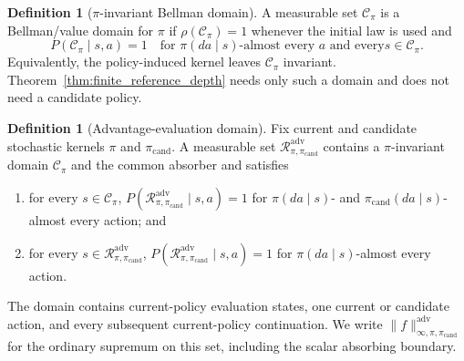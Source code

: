 \documentclass{article}
\theoremstyle{plain}
\theoremstyle{definition}
\newtheorem{definition}[theorem]{Definition}
\theoremstyle{remark}
\begin{document}
\begin{definition}[$\pi$-invariant Bellman domain]
\label{def:reachable}
A measurable set $\mathcal C_\pi$ is a Bellman/value domain for $\pi$ if
$\rho(\mathcal C_\pi)=1$ whenever the initial law is used and
\[
P(\mathcal C_\pi\mid s,a)=1
\quad\text{for $\pi(da\mid s)$-almost every $a$ and every
$s\in\mathcal C_\pi$.}
\]
Equivalently, the policy-induced kernel leaves $\mathcal C_\pi$ invariant.
Theorem~\ref{thm:finite_reference_depth} needs only such a domain and does
not need a candidate policy.
\end{definition}

\begin{definition}[Advantage-evaluation domain]
\label{def:adv_closure}
Fix current and candidate stochastic kernels $\pi$ and
$\pi_{\mathrm{cand}}$. A measurable set
$\mathcal R_{\pi,\pi_{\mathrm{cand}}}^{\mathrm{adv}}$ contains a
$\pi$-invariant domain $\mathcal C_\pi$ and the common absorber and satisfies
\begin{enumerate}
\item for every $s\in\mathcal C_\pi$,
$P(\mathcal R_{\pi,\pi_{\mathrm{cand}}}^{\mathrm{adv}}\mid s,a)=1$
for $\pi(da\mid s)$- and $\pi_{\mathrm{cand}}(da\mid s)$-almost every
action; and
\item for every
$s\in\mathcal R_{\pi,\pi_{\mathrm{cand}}}^{\mathrm{adv}}$,
$P(\mathcal R_{\pi,\pi_{\mathrm{cand}}}^{\mathrm{adv}}\mid s,a)=1$
for $\pi(da\mid s)$-almost every action.
\end{enumerate}
The domain contains current-policy evaluation states, one current or
candidate action, and every subsequent current-policy continuation. We write
$\|f\|_{\infty,\pi,\pi_{\mathrm{cand}}}^{\mathrm{adv}}$ for the ordinary
supremum on this set, including the scalar absorbing boundary.
\end{definition}
\end{document}
